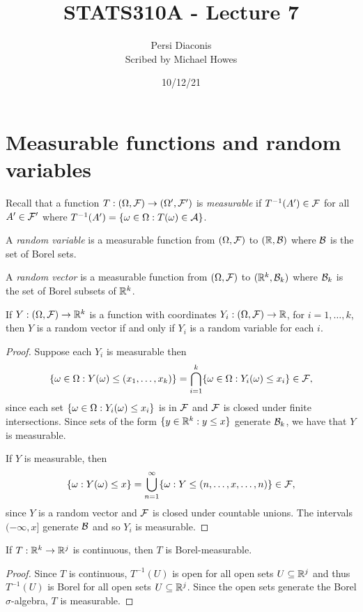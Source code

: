 




\title{STATS310A - Lecture 7}
\author{Persi Diaconis\\ Scribed by Michael Howes}
\date{10/12/21}

\pagestyle{fancy}
\fancyhf{}


\maketitle
\tableofcontents
\section{Measurable functions and random variables}
Recall that a function $T:({{\Omega}}, {\mathcal{F}}) \to ({{\Omega}}', {\mathcal{F}}')$ is \emph{measurable} if $T^{-1}(A') \in {\mathcal{F}}$ for all $A' \in {\mathcal{F}}'$ where $T^{-1}(A') = \{{\omega} \in {{\Omega}} : T({\omega}) \in {\mathcal{A}}\}$.

A \emph{random variable} is a measurable function from $({{\Omega}},{\mathcal{F}})$ to $({\mathbb R}, {\mathcal{B}})$ where ${\mathcal{B}}$ is the set of Borel sets.

A \emph{random vector} is a measurable function from $({{\Omega}}, {\mathcal{F}})$ to $({\mathbb R}^k, {\mathcal{B}}_k)$ where ${\mathcal{B}}_k$ is the set of Borel subsets of ${\mathbb R}^k$.

\begin{lemma}
    If $Y:({{\Omega}},{\mathcal{F}}) \to {\mathbb R}^k$ is a function with coordinates $Y_i:({{\Omega}},{\mathcal{F}}) \to {\mathbb R}$, for $i=1,\ldots, k$, then $Y$ is a random vector if and only if $Y_i$ is a random variable for each $i$.
\end{lemma}
\begin{proof}
    Suppose each $Y_i$ is measurable then 
    \[\{{\omega} \in {{\Omega}} : Y({\omega}) \le (x_1,\ldots,x_k)\} = \bigcap_{i=1}^k \{{\omega} \in {{\Omega}} : Y_i({\omega}) \le x_i\} \in {\mathcal{F}}, \]
    since each set $\{{\omega} \in {{\Omega}} : Y_i({\omega}) \le x_i \}$ is in ${\mathcal{F}}$ and ${\mathcal{F}}$ is closed under finite intersections. Since sets of the form $\{y \in {\mathbb R}^k : y \le x\}$ generate ${\mathcal{B}}_k$, we have that $Y$ is measurable.
    
    If $Y$ is measurable, then 
    \[\{{\omega} : Y({\omega}) \le x \} = \bigcup_{n=1}^\infty \{{\omega} : Y \le (n,\ldots, x, \ldots, n)\} \in {\mathcal{F}}, \]
    since $Y$ is a random vector and ${\mathcal{F}}$ is closed under countable unions. The intervals $(-\infty, x]$ generate ${\mathcal{B}}$ and so $Y_i$ is measurable.
\end{proof}
\begin{lemma}
    If $T: {\mathbb R}^k \to {\mathbb R}^j$ is continuous, then $T$ is Borel-measurable.
\end{lemma}
\begin{proof}
    Since $T$ is continuous, $T^{-1}(U)$ is open for all open sets $U \subseteq {\mathbb R}^j$ and thus $T^{-1}(U)$ is Borel for all open sets $U \subseteq {\mathbb R}^j$. Since the open sets generate the Borel $\sigma$-algebra, $T$ is measurable.
\end{proof}

